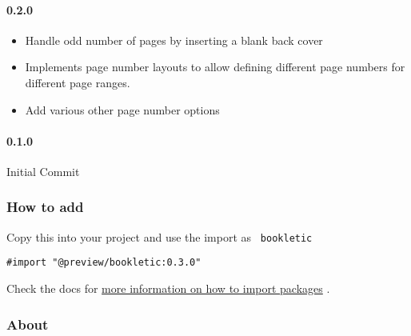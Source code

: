 \paragraph{0.2.0}\label{section-1}

\begin{itemize}
\tightlist
\item
  Handle odd number of pages by inserting a blank back cover
\item
  Implements page number layouts to allow defining different page
  numbers for different page ranges.
\item
  Add various other page number options
\end{itemize}

\paragraph{0.1.0}\label{section-2}

Initial Commit

\subsubsection{How to add}\label{how-to-add}

Copy this into your project and use the import as \texttt{\ bookletic\ }

\begin{verbatim}
#import "@preview/bookletic:0.3.0"
\end{verbatim}



Check the docs for
\href{https://typst.app/docs/reference/scripting/\#packages}{more
information on how to import packages} .

\subsubsection{About}\label{about}

